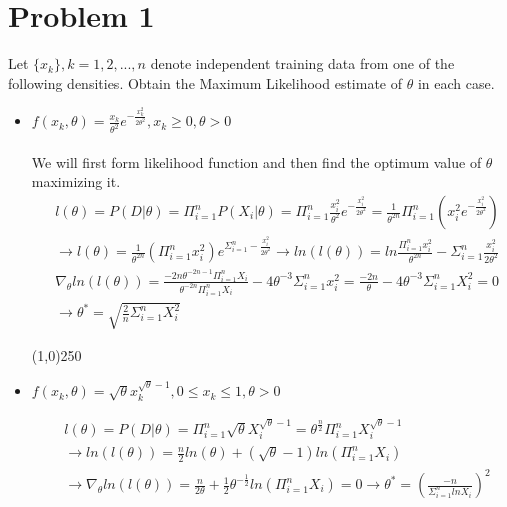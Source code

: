 \documentclass[12pt]{article}
\newcommand{\Pin}{\Pi_{i=1}^n}
\newcommand{\Sumn}{\Sigma_{i=1}^n}
\begin{document}

\tableofcontents
\pagebreak


\section{Problem 1}
Let $\{x_k\}, k = 1,2, ... , n$ denote independent training data from one of the following densities.
Obtain the Maximum Likelihood estimate of $\theta$ in each case.

\begin{itemize}
\item $f(x_k, \theta) = \frac{x_k}{\theta^2}e^{-\frac{x_k^2}{2\theta^2}}, x_k \geq 0, \theta > 0$ \\ \\
We will first form likelihood function and then find the optimum value of $\theta$ maximizing it.
\begin{align*}
&l(\theta) = P(D|\theta) = \Pi_{i=1}^n P(X_i|\theta) = \Pi_{i=1}^n \frac{x_i^2}{\theta^2} e^{-\frac{x_i^2}{2\theta^2}} = \frac{1}{\theta^{2n}}\Pi_{i=1}^n (x_i^2 e^{-\frac{x_i^2}{2\theta^2}})\\
&\rightarrow l(\theta) = \frac{1}{\theta^{2n}}(\Pi_{i=1}^n x_i^2 )e^{\Sigma_{i=1}^n -\frac{x_i^2}{2\theta^2}} \rightarrow ln (l(\theta)) = ln \frac{\Pi_{i=1}^n x_i^2}{\theta^{2n}} - \Sigma_{i=1}^n \frac{x_i^2}{2\theta^2}\\
& \nabla_\theta ln(l(\theta)) = \frac{-2n\theta^{-2n-1}\Pi_{i=1}^n X_i}{\theta^{-2n}\Pi_{i=1}^nX_i} - 4\theta^{-3} \Sigma_{i=1}^n x_i^2 = \frac{-2n}{\theta} - 4\theta^{-3}\Sigma_{i=1}^nX_i^2 = 0\\
&\rightarrow \theta^* = \sqrt{\frac{2}{n} \Sigma_{i=1}^n X_i^2}
\end{align*}

\begin{center}
\line(1,0){250}
\end{center}
\item $f(x_k, \theta) = \sqrt{\theta} x_k^{\sqrt{\theta} - 1}, 0 \leq x_k \leq 1, \theta > 0$ 

\begin{align*}
&l(\theta) = P(D|\theta) = \Pin \sqrt{\theta} X_i^{\sqrt{\theta} - 1} = \theta^\frac{n}{2} \Pin X_i^{\sqrt{\theta} - 1} \\
&\rightarrow ln(l(\theta)) = \frac{n}{2} ln(\theta) + (\sqrt{\theta} - 1)ln(\Pin X_i)\\
&\rightarrow \nabla_\theta ln(l(\theta)) = \frac{n}{2\theta} + \frac{1}{2} \theta^{-\frac{1}{2}}ln(\Pin X_i) = 0 \rightarrow \theta^* = (\frac{-n}{\Sumn ln X_i})^2
\end{align*}

\end{itemize}
\end{document}
